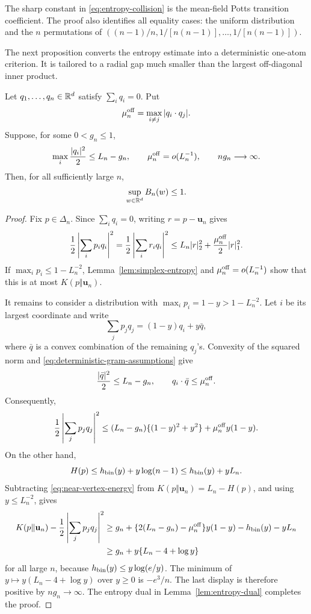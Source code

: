 \begin{remark}
The sharp constant in \eqref{eq:entropy-collision} is the mean-field Potts
transition coefficient. The proof also identifies all equality cases:
the uniform distribution and the \(n\) permutations of
\(( (n-1)/n,1/[n(n-1)],\ldots,1/[n(n-1)] )\).
\end{remark}

The next proposition converts the entropy estimate into a deterministic
one-atom criterion. It is tailored to a radial gap much smaller than the
largest off-diagonal inner product.

\begin{proposition}
\label{prop:deterministic-gram}
Let \(q_1,\ldots,q_n\in\mathbb R^d\) satisfy \(\sum_iq_i=0\). Put
\[
  \mu_n^{\rm off}=\max_{i\ne j}|q_i\cdot q_j|.
\]
Suppose, for some \(0<g_n\le1\),
\begin{equation}
\label{eq:deterministic-gram-assumptions}
  \max_i\frac{|q_i|^2}{2}\le L_n-g_n,
  \qquad
  \mu_n^{\rm off}=o(L_n^{-1}),
  \qquad
  ng_n\longrightarrow\infty.
\end{equation}
Then, for all sufficiently large \(n\),
\[
  \sup_{w\in\mathbb R^d}B_n(w)\le1.
\]
\end{proposition}

\begin{proof}
Fix \(p\in\Delta_n\). Since \(\sum_iq_i=0\), writing
\(r=p-\mathbf u_n\) gives
\[
  \frac12\left|\sum_i p_iq_i\right|^2
  =
  \frac12\left|\sum_i r_iq_i\right|^2
  \le
  L_n|r|_2^2+\frac{\mu_n^{\rm off}}{2}|r|_1^2.
\]
If \(\max_i p_i\le1-L_n^{-2}\), Lemma~\ref{lem:simplex-entropy} and
\(\mu_n^{\rm off}=o(L_n^{-1})\) show that this is at most \(K(p\Vert \mathbf u_n)\).

It remains to consider a distribution with
\(\max_i p_i=1-y>1-L_n^{-2}\). Let \(i\) be its largest coordinate and
write
\[
  \sum_jp_jq_j=(1-y)q_i+y\bar q,
\]
where \(\bar q\) is a convex combination of the remaining \(q_j\)'s.
Convexity of the squared norm and
\eqref{eq:deterministic-gram-assumptions} give
\[
  \frac{|\bar q|^2}{2}\le L_n-g_n,
  \qquad
  q_i\cdot\bar q\le \mu_n^{\rm off}.
\]
Consequently,
\begin{equation}
\label{eq:near-vertex-energy}
  \frac12\left|\sum_jp_jq_j\right|^2
  \le
  (L_n-g_n)\{(1-y)^2+y^2\}
  +\mu_n^{\rm off}y(1-y).
\end{equation}
On the other hand,
\[
  H(p)\le h_{\rm bin}(y)+y\log(n-1)\le h_{\rm bin}(y)+yL_n.
\]
Subtracting \eqref{eq:near-vertex-energy} from
\(K(p\Vert \mathbf u_n)=L_n-H(p)\), and using \(y\le L_n^{-2}\), gives
\begin{align*}
  K(p\Vert \mathbf u_n)
  -\frac12\left|\sum_jp_jq_j\right|^2
  &\ge
  g_n+\{2(L_n-g_n)-\mu_n^{\rm off}\}y(1-y)-h_{\rm bin}(y)-yL_n\\
  &\ge
  g_n+y\{L_n-4+\log y\}
\end{align*}
for all large \(n\), because \(h_{\rm bin}(y)\le y\log(e/y)\).
The minimum of \(y\mapsto y(L_n-4+\log y)\) over \(y\ge0\) is
\(-e^3/n\). The last display is therefore positive by \(ng_n\to\infty\).
The entropy dual in Lemma~\ref{lem:entropy-dual} completes the proof.
\end{proof}

